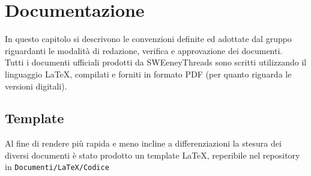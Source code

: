 \documentclass[a4paper]{report}
\begin{document}
		\section{Documentazione} %
			In questo capitolo si descrivono le convenzioni definite ed adottate dal gruppo riguardanti le 
			modalità di redazione, verifica e approvazione dei documenti. \\
			Tutti i documenti ufficiali prodotti da SWEeneyThreads sono scritti utilizzando il linguaggio \LaTeX{}, compilati e
			 forniti in formato PDF (per quanto riguarda le versioni digitali).
			\subsection{Template}
				Al fine di rendere più rapida e meno incline a differenziazioni la stesura dei diversi documenti è stato prodotto un
				 template \LaTeX, reperibile nel repository in \verb|Documenti/LaTeX/Codice| %
\end{document}
